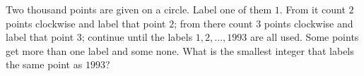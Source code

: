 Two thousand points are given on a circle. Label one of them $1$. From it count $2$ points clockwise and label that point $2$; from there count $3$ points clockwise and label that point $3$; continue until the labels $1,2,\dots,1993$ are all used. Some points get more than one label and some none. What is the smallest integer that labels the same point as $1993$?
